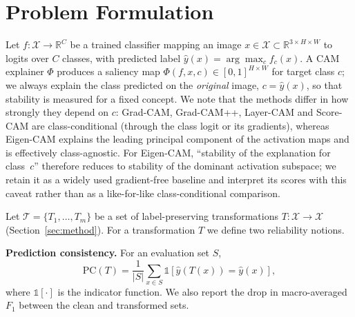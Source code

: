 \documentclass[runningheads]{llncs}
\begin{document}
\section{Problem Formulation}\label{sec:prob}
Let $f:\mathcal{X}\rightarrow\mathbb{R}^{C}$ be a trained classifier mapping an
image $x\in\mathcal{X}\subset\mathbb{R}^{3\times H\times W}$ to logits over $C$
classes, with predicted label $\hat{y}(x)=\arg\max_{c} f_c(x)$. A CAM explainer
$\Phi$ produces a saliency map $\Phi(f,x,c)\in[0,1]^{H\times W}$ for target class
$c$; we always explain the class predicted on the \emph{original} image,
$c=\hat{y}(x)$, so that stability is measured for a fixed concept. We note that the
methods differ in how strongly they depend on $c$: Grad-CAM, Grad-CAM++, Layer-CAM
and Score-CAM are class-conditional (through the class logit or its gradients),
whereas Eigen-CAM explains the leading principal component of the activation maps
and is effectively class-agnostic. For Eigen-CAM, ``stability of the explanation
for class~$c$'' therefore reduces to stability of the dominant activation subspace;
we retain it as a widely used gradient-free baseline and interpret its scores with
this caveat rather than as a like-for-like class-conditional comparison.

Let $\mathcal{T}=\{T_1,\dots,T_m\}$ be a set of label-preserving transformations
$T:\mathcal{X}\rightarrow\mathcal{X}$ (Section~\ref{sec:method}). For a
transformation $T$ we define two reliability notions.

\smallskip
\noindent\textbf{Prediction consistency.} For an evaluation set $S$,
\begin{equation}
\mathrm{PC}(T)=\frac{1}{|S|}\sum_{x\in S}\mathbb{1}\!\left[\hat{y}(T(x))=\hat{y}(x)\right],
\label{eq:pc}
\end{equation}
where $\mathbb{1}[\cdot]$ is the indicator function. We also report the drop in
macro-averaged $F_1$ between the clean and transformed sets.
\end{document}
